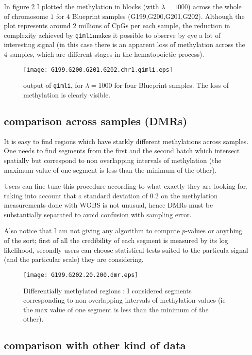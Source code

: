 \documentclass[11pt]{amsart}
\newcommand{\gimli}{\texttt{gimli}}
\begin{document}
In figure \ref{ex1} I plotted the methylation in blocks (with $\lambda=1000$) 
across the whole of chromosome $1$ for $4$ Blueprint samples
(G199,G200,G201,G202). Although the plot represents around $2$ millions of 
CpGs per each sample, the reduction in complexity achieved by \gimli makes it 
possible to observe by eye a lot of interesting signal (in this case there is 
an apparent loss of methylation across the $4$ samples, which are different 
stages in the hematopoietic process).

\begin{figure}\label{ex1}
\texttt{[image: G199.G200.G201.G202.chr1.gimli.eps]}
\caption{output of \gimli, for $\lambda=1000$ for four Blueprint samples. The loss of
methylation is clearly visible.}
\end{figure}

\subsection{comparison across samples (DMRs)}

It is easy to find regions which have starkly different 
methylations across samples. One needs to find segments 
from the first and the second batch which intersect spatially
but correspond to non overlapping intervals of methylation 
(the maximum value of one 
segment is less than the minimum of the other).

Users can fine tune this procedure according to what exactly they 
are looking for, taking into account that a standard deviation of $0.2$
on the methylation measurements done with WGBS is not unusual, hence
DMRs must be substantially separated to avoid confusion with sampling error.

Also notice that I am not giving any algorithm to compute $p$-values
or anything of the sort; first of all the credibility of each segment
is measured by its log likelihood, secondly users can choose statistical
tests suited to the particula signal (and the particular scale)
they are considering.

\begin{figure}\label{ex1}
\texttt{[image: G199.G202.20.200.dmr.eps]}
\caption{Differentially methylated regions : I considered segments corresponding to
non overlapping intervals of methylation values (ie the max value of one 
segment is less than the minimum of the other).}
\end{figure}

\subsection{comparison with other kind of data}
\end{document}
